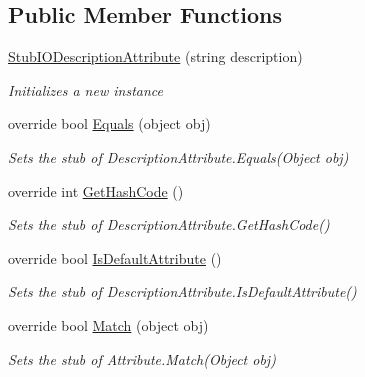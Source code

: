 \subsection*{Public Member Functions}
\begin{DoxyCompactItemize}
\item 
\hyperlink{class_system_1_1_i_o_1_1_fakes_1_1_stub_i_o_description_attribute_a5407d3ddad4b444286867bd0e22dba7c}{Stub\-I\-O\-Description\-Attribute} (string description)
\begin{DoxyCompactList}\small\item\em Initializes a new instance\end{DoxyCompactList}\item 
override bool \hyperlink{class_system_1_1_i_o_1_1_fakes_1_1_stub_i_o_description_attribute_a48d1fc5b8d2a759b3809c8f498e1bd42}{Equals} (object obj)
\begin{DoxyCompactList}\small\item\em Sets the stub of Description\-Attribute.\-Equals(\-Object obj)\end{DoxyCompactList}\item 
override int \hyperlink{class_system_1_1_i_o_1_1_fakes_1_1_stub_i_o_description_attribute_ad83cd1f1a21fb560d09ecd367088b4d9}{Get\-Hash\-Code} ()
\begin{DoxyCompactList}\small\item\em Sets the stub of Description\-Attribute.\-Get\-Hash\-Code()\end{DoxyCompactList}\item 
override bool \hyperlink{class_system_1_1_i_o_1_1_fakes_1_1_stub_i_o_description_attribute_abc4f067bc41b28c1d1475e0256b57931}{Is\-Default\-Attribute} ()
\begin{DoxyCompactList}\small\item\em Sets the stub of Description\-Attribute.\-Is\-Default\-Attribute()\end{DoxyCompactList}\item 
override bool \hyperlink{class_system_1_1_i_o_1_1_fakes_1_1_stub_i_o_description_attribute_a943285a758b470818915e2e8807a4dd2}{Match} (object obj)
\begin{DoxyCompactList}\small\item\em Sets the stub of Attribute.\-Match(\-Object obj)\end{DoxyCompactList}\end{DoxyCompactItemize}
